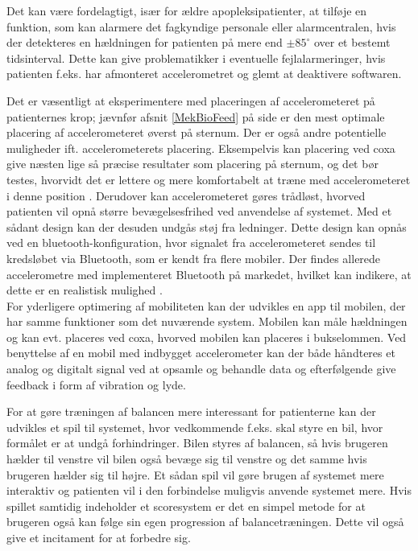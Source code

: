 Det kan være fordelagtigt, især for ældre apopleksipatienter, at tilføje en funktion, som kan alarmere det fagkyndige personale eller alarmcentralen, hvis der detekteres en hældningen for patienten på mere end $\pm85^{\circ}$ over et bestemt tidsinterval. Dette kan give problematikker i eventuelle fejlalarmeringer, hvis patienten f.eks. har afmonteret accelerometret og glemt at deaktivere softwaren.

Det er væsentligt at eksperimentere med placeringen af accelerometeret på patienternes krop; jævnfør afsnit \ref{MekBioFeed} på side \pageref{MekBioFeed} er den mest optimale placering af accelerometeret øverst på sternum. Der er også andre potentielle muligheder ift. accelerometerets placering. Eksempelvis kan placering ved coxa give næsten lige så præcise resultater som placering på sternum, og det bør testes, hvorvidt det er lettere og mere komfortabelt at træne med accelerometeret i denne position \cite{Gjoreski2011}. Derudover kan accelerometeret gøres trådløst, hvorved patienten vil opnå større bevægelsesfrihed ved anvendelse af systemet. Med et sådant design kan der desuden undgås støj fra ledninger. Dette design kan opnås ved en bluetooth-konfiguration, hvor signalet fra accelerometeret sendes til kredsløbet via Bluetooth, som er kendt fra flere mobiler. Der findes allerede accelerometre med implementeret Bluetooth på markedet, hvilket kan indikere, at dette er en realistisk mulighed \cite{Axivity2015, Bioradio2015}. \\
For yderligere optimering af mobiliteten kan der udvikles en app til mobilen, der har samme funktioner som det nuværende system. Mobilen kan måle hældningen og kan evt. placeres ved coxa, hvorved mobilen kan placeres i bukselommen. Ved benyttelse af en mobil med indbygget accelerometer kan der både håndteres et analog og digitalt signal ved at opsamle og behandle data og efterfølgende give feedback i form af vibration og lyde. %

For at gøre træningen af balancen mere interessant for patienterne kan der udvikles et spil til systemet, hvor vedkommende f.eks. skal styre en bil, hvor formålet er at undgå forhindringer. Bilen styres af balancen, så hvis brugeren hælder til venstre vil bilen også bevæge sig til venstre og det samme hvis brugeren hælder sig til højre. Et sådan spil vil gøre brugen af systemet mere interaktiv og patienten vil i den forbindelse muligvis anvende systemet mere. Hvis spillet samtidig indeholder et scoresystem er det en simpel metode for at brugeren også kan følge sin egen progression af balancetræningen. Dette vil også give et incitament for at forbedre sig. 